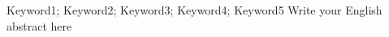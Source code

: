 
\begin{abstract}
    {关键词1；关键词2；关键词3；关键词4；关键词5}
    在此处撰写中文摘要（300--500字）
\end{abstract}

\begin{abstractEng}
    {Keyword1; Keyword2; Keyword3; Keyword4; Keyword5}
    Write your English abstract here
\end{abstractEng}
